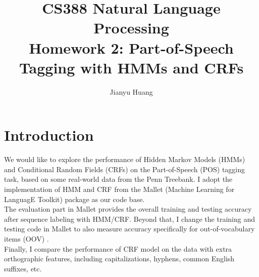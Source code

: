 \documentclass[winfonts,UTF8]{article}
\begin{document}
    \title{CS388 Natural Language Processing\\Homework 2: Part-of-Speech Tagging with HMMs and CRFs}
    \author{Jianyu Huang}
    \maketitle

    
\section{Introduction}
We would like to explore the performance of Hidden Markov Models (HMMs) and Conditional Random Fields (CRFs) on the Part-of-Speech (POS) tagging task, based on some real-world data from the Penn Treebank\cite{laa}. I adopt the implementation of HMM and CRF from the Mallet (Machine Learning for LanguagE Toolkit) package\cite{mallet} as our code base.\\
The evaluation part in Mallet provides the overall training and testing accuracy after sequence labeling with HMM/CRF. Beyond that, I change the training and testing code in Mallet to also measure accuracy specifically for out-of-vocabulary items (OOV) \cite{laa}.\\
Finally, I compare the performance of CRF model on the data with extra orthographic features, including capitalizations, hyphens, common English suffixes, etc.
\end{document}
